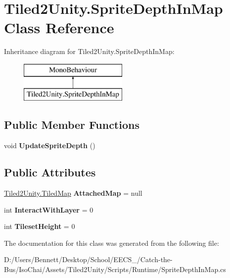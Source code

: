 \hypertarget{class_tiled2_unity_1_1_sprite_depth_in_map}{}\section{Tiled2\+Unity.\+Sprite\+Depth\+In\+Map Class Reference}
\label{class_tiled2_unity_1_1_sprite_depth_in_map}
Inheritance diagram for Tiled2\+Unity.\+Sprite\+Depth\+In\+Map\+:\begin{figure}[H]
\begin{center}
\leavevmode
\includegraphics[height=2.000000cm]{class_tiled2_unity_1_1_sprite_depth_in_map}
\end{center}
\end{figure}
\subsection*{Public Member Functions}
\begin{DoxyCompactItemize}
\item 
\mbox{\label{class_tiled2_unity_1_1_sprite_depth_in_map_a79ca9fab2c970a7b1b38ac517b1b7e4f}} 
void {\bfseries Update\+Sprite\+Depth} ()
\end{DoxyCompactItemize}
\subsection*{Public Attributes}
\begin{DoxyCompactItemize}
\item 
\mbox{\label{class_tiled2_unity_1_1_sprite_depth_in_map_a5dd8f08b23b777e39c8b487c83f031d5}} 
\mbox{\hyperlink{class_tiled2_unity_1_1_tiled_map}{Tiled2\+Unity.\+Tiled\+Map}} {\bfseries Attached\+Map} = null
\item 
\mbox{\label{class_tiled2_unity_1_1_sprite_depth_in_map_aa4341e388711f701a946f7cbd28ca0ca}} 
int {\bfseries Interact\+With\+Layer} = 0
\item 
\mbox{\label{class_tiled2_unity_1_1_sprite_depth_in_map_a0f4e0cf735c9ec63f3362751b89edd60}} 
int {\bfseries Tileset\+Height} = 0
\end{DoxyCompactItemize}


The documentation for this class was generated from the following file\+:\begin{DoxyCompactItemize}
\item 
D\+:/\+Users/\+Bennett/\+Desktop/\+School/\+E\+E\+C\+S\+\_/\+Catch-\/the-\/\+Bus/\+Iso\+Chai/\+Assets/\+Tiled2\+Unity/\+Scripts/\+Runtime/Sprite\+Depth\+In\+Map.\+cs\end{DoxyCompactItemize}
